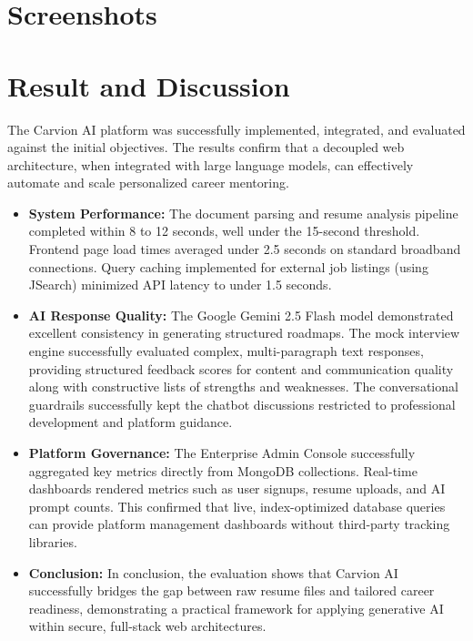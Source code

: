 \documentclass[12pt]{article}
\begin{document}
\clearpage
\section{Screenshots}

\newpage
\mbox{}
\newpage
\mbox{}
\newpage
\mbox{}

\clearpage
\section{Result and Discussion}

The Carvion AI platform was successfully implemented, integrated, and evaluated against the initial objectives. The results confirm that a decoupled web architecture, when integrated with large language models, can effectively automate and scale personalized career mentoring.

\begin{itemize}
  \item \textbf{System Performance:} The document parsing and resume analysis pipeline completed within 8 to 12 seconds, well under the 15-second threshold. Frontend page load times averaged under 2.5 seconds on standard broadband connections. Query caching implemented for external job listings (using JSearch) minimized API latency to under 1.5 seconds.
  \item \textbf{AI Response Quality:} The Google Gemini 2.5 Flash model demonstrated excellent consistency in generating structured roadmaps. The mock interview engine successfully evaluated complex, multi-paragraph text responses, providing structured feedback scores for content and communication quality along with constructive lists of strengths and weaknesses. The conversational guardrails successfully kept the chatbot discussions restricted to professional development and platform guidance.
  \item \textbf{Platform Governance:} The Enterprise Admin Console successfully aggregated key metrics directly from MongoDB collections. Real-time dashboards rendered metrics such as user signups, resume uploads, and AI prompt counts. This confirmed that live, index-optimized database queries can provide platform management dashboards without third-party tracking libraries.
  \item \textbf{Conclusion:} In conclusion, the evaluation shows that Carvion AI successfully bridges the gap between raw resume files and tailored career readiness, demonstrating a practical framework for applying generative AI within secure, full-stack web architectures.
\end{itemize}
\end{document}
